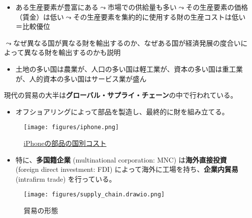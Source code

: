 \documentclass[
  xelatex,
  ja=standard]{bxjsarticle}
\providecommand{\tightlist}{%
  \setlength{\itemsep}{0pt}\setlength{\parskip}{0pt}}\usepackage{longtable,booktabs,array}
\begin{document}
\begin{itemize}
\tightlist
\item
  ある生産要素が豊富にある\(\leadsto\)市場での供給量も多い\(\leadsto\)その生産要素の価格（賃金）は低い\(\leadsto\)その生産要素を集約的に使用する財の生産コストは低い＝比較優位
\end{itemize}

\(\leadsto\)なぜ異なる国が異なる財を輸出するのか、なぜある国が経済発展の度合いによって異なる財を輸出するのかも説明

\begin{itemize}
\tightlist
\item
  土地の多い国は農業が、人口の多い国は軽工業が、資本の多い国は重工業が、人的資本の多い国はサービス業が盛ん
\end{itemize}

現代の貿易の大半は\textbf{グローバル・サプライ・チェーン}の中で行われている。

\begin{itemize}
\tightlist
\item
  オフショアリングによって部品を製造し、最終的に財を組み立てる。
\end{itemize}

\begin{figure}[htpb]

{\centering \texttt{[image: figures/iphone.png]}

}

\caption{\href{https://asia.nikkei.com/Business/Technology/iPhone-14-teardown-reveals-parts-20-costlier-than-previous-model}{iPhoneの部品の国別コスト}}

\end{figure}

\begin{itemize}
\tightlist
\item
  特に、\textbf{多国籍企業} (multinational corporation: MNC)
  は\textbf{海外直接投資} (foreign direct investment: FDI)
  によって海外に工場を持ち、\textbf{企業内貿易} (intrafirm trade)
  を行っている。
\end{itemize}

\begin{figure}[htpb]

{\centering \texttt{[image: figures/supply\_chain.drawio.png]}

}

\caption{貿易の形態\citep{inomata2019}}

\end{figure}
\end{document}
